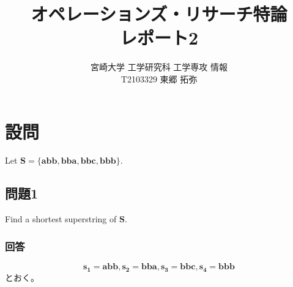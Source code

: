 \documentclass[a4j, uplatex, fleqn, dvipdfmx]{jsarticle} %
\title{\vspace{-1.5cm}オペレーションズ・リサーチ特論\\レポート2}
\author{宮崎大学 工学研究科 工学専攻 情報\\T2103329 東郷 拓弥}
\begin{document}
\maketitle

\section{設問}
Let $\bm{S} = \{\bm{abb}, \bm{bba}, \bm{bbc}, \bm{bbb}\}$.
\subsection{問題1}
Find a shortest superstring of $\bm{S}$.
\subsubsection{回答}
\[
  \bm{s_1} = \bm{abb}, \bm{s_2} = \bm{bba}, \bm{s_3} = \bm{bbc}, \bm{s_4} = \bm{bbb}
\]
とおく。
\end{document}
